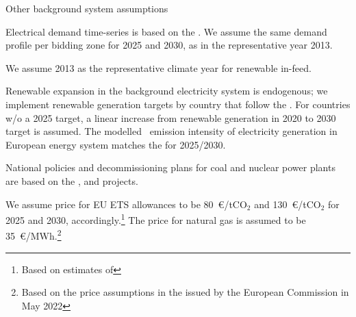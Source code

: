 \begin{frame}{Other background system assumptions}

\begin{itemize}
  {\small 
\item Electrical demand time-series is based on the 
. 
We assume the same demand profile per bidding zone for 2025 and 2030, as in the representative year 2013. 
\item We assume 2013 as the representative climate year for renewable in-feed.
\item Renewable expansion in the background electricity system is endogenous; we implement renewable generation targets by country that follow the . For countries w/o a 2025 target, a linear increase from renewable generation in 2020 to 2030 target is assumed. The modelled \co~emission intensity of electricity generation in European energy system matches the  for 2025/2030.
\item  National policies and decommissioning plans for coal and nuclear 
power plants are based on the 
, 
and  projects.
\item We assume price for EU ETS allowances to be 80~\euro/tCO$_2$ 
and 130~\euro/tCO$_2$ for 2025 and 2030, accordingly.\footnote{{\scriptsize 
Based on estimates of 
}}
The price for natural gas is assumed to be 35~\euro/MWh.\footnote{{\scriptsize Based on the price assumptions in the 
issued by the European Commission in May 2022}}
}
\vspace{0.2cm}
\end{itemize}

\end{frame}



